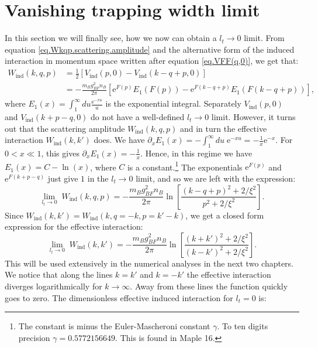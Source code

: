 \section{Vanishing trapping width limit} \label{sec.Vanishingtrappingwidtlimit}
In this section we will finally see, how we now can obtain a $l_t\to 0$ limit. From equation \eqref{eq.Wkqp.scattering.amplitude} and the alternative form of the induced interaction in momentum space written after equation \eqref{eq.VFF(q,0)}, we get that:
\begin{align}
W_{\text{ind}}(k, q, p) &= \frac{1}{2}\left[V_\text{ind}(p, 0) - V_\text{ind}(k - q + p, 0)\right] \nonumber \\
&= -\frac{m_Bg_{BF}^2n_B}{2\pi}\left[ \text{e}^{F(p)} E_1(F(p)) - \text{e}^{F(k - q + p)} E_1(F(k - q + p)) \right], \nonumber
\end{align}
where $E_1(x) = \int_1^\infty du \frac{\text{e}^{-xu}}{u}$ is the exponential integral. Separately $V_\text{ind}(p,0)$ and $V_\text{ind}(k + p - q,0)$ do not have a well-defined $l_t \to 0$ limit. However, it turns out that the scattering amplitude $W_{\text{ind}}(k, q, p)$ and in turn the effective interaction $W_{\text{ind}}(k,k')$ does. We have $\partial_x E_1(x) = -\int_1^{\infty}du\; \text{e}^{-xu} = -\frac{1}{x}\text{e}^{-x}$. For $0<x\ll 1$, this gives $\partial_xE_1(x) = -\frac{1}{x}$. Hence, in this regime we have $E_1(x) = C -\ln(x)$, where $C$ is a constant.\footnote{The constant is minus the Euler-Mascheroni constant $\gamma$. To ten digits precision $\gamma = 0.5772156649$. This is found in Maple 16.} The exponentials $\text{e}^{F(p)}$ and $\text{e}^{F(k + p - q)}$ just give $1$ in the $l_t \to 0$ limit, and so we are left with the expression:
\begin{equation}
\lim_{l_t \to 0} \; W_{\text{ind}}(k, q, p) = -\frac{m_Bg_{BF}^2n_B}{2\pi} \ln\left[\frac{(k - q + p)^2+2/\xi^2}{p^2+2/\xi^2}\right].
\label{eq.Wkqp.scattering.amplitude.lt=0} 
\end{equation}
Since $W_{\text{ind}}(k, k') = W_{\text{ind}}(k, q = -k, p = k' - k) $, we get a closed form expression for the effective interaction:
\begin{equation}
\lim_{l_t \to 0} \; W_{\text{ind}}(k, k') = -\frac{m_Bg_{BF}^2n_B}{2\pi} \ln\left[\frac{(k + k')^2+2/\xi^2}{(k - k')^2+2/\xi^2}\right].
\label{eq.EffectiveInteractionlt=0} 
\end{equation}
This will be used extensively in the numerical analyses in the next two chapters. We notice that along the lines $k = k'$ and $k = -k'$ the effective interaction diverges logarithmically for $k\to \infty$. Away from these lines the function quickly goes to zero. The dimensionless effective induced interaction for $l_t = 0$ is:
